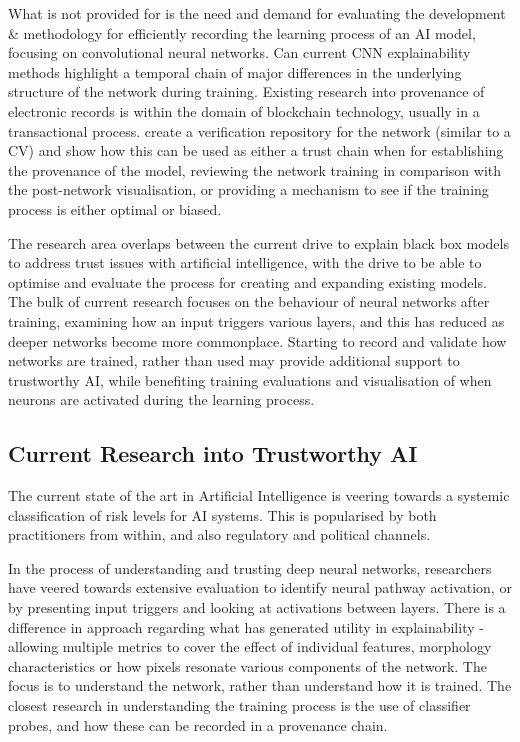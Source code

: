 What is not provided for is the need and demand for evaluating the development \& methodology for efficiently recording the learning process of an AI model, focusing on convolutional neural networks. Can current CNN explainability methods highlight a temporal chain of major differences in the underlying structure of the network during training. Existing research into provenance of electronic records is within the domain of blockchain technology, usually in a transactional process\cite{kimOntologydrivenBlockchainDesign2018}. create a verification repository for the network (similar to a CV) and show how this can be used as either a trust chain when for establishing the provenance of the model, reviewing the network training in comparison with the post-network visualisation, or providing a mechanism to see if the training process is either optimal or biased.

The research area overlaps between the current drive to explain black box models to address trust issues with artificial intelligence, with the drive to be able to optimise and evaluate the process for creating and expanding existing models. The bulk of current research focuses on the behaviour of neural networks after training, examining how an input triggers various layers, and this has reduced as deeper networks become more commonplace. Starting to record and validate how networks are trained, rather than used may provide additional support to trustworthy AI, while benefiting training evaluations and visualisation of when neurons are activated during the learning process.


\subsection{Current Research into Trustworthy AI}
The current state of the art in Artificial Intelligence is veering towards a systemic classification of risk levels for AI systems. This is popularised by both practitioners from within, and also regulatory and political channels.

In the process of understanding and trusting deep neural networks, researchers have veered towards extensive evaluation to identify neural pathway activation, or by presenting input triggers and looking at activations between layers\cite{liVisualizingLossLandscape2018}. There is a difference in approach regarding what has generated utility in explainability - allowing multiple metrics to cover the effect of individual features, morphology characteristics or how pixels resonate various components of the network. The focus is to understand the network, rather than understand how it is trained. The closest research in understanding the training process is the use of classifier probes, and how these can be recorded in a provenance chain.

